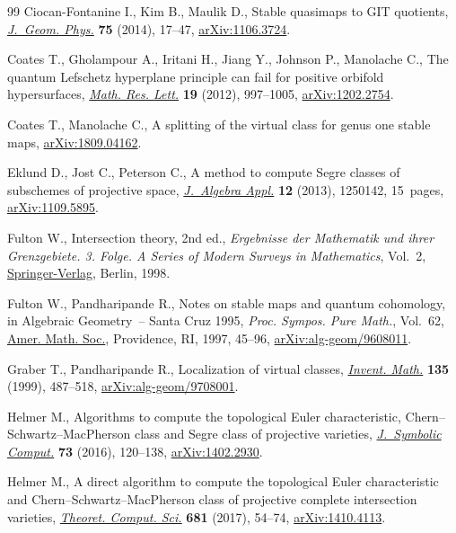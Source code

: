 \documentclass[pdftex]{sigma}
\numberwithin{equation}{section}
\theoremstyle{plain}
\theoremstyle{definition}
\theoremstyle{remark}
\begin{document}
\begin{thebibliography}{99}
Ciocan-Fontanine I., Kim B., Maulik D., Stable quasimaps to {GIT} quotients,
 \href{https://doi.org/10.1016/j.geomphys.2013.08.019}{\textit{J.~Geom. Phys.}} \textbf{75} (2014), 17--47, \href{https://arxiv.org/abs/1106.3724}{arXiv:1106.3724}.

Coates T., Gholampour A., Iritani H., Jiang Y., Johnson P., Manolache C., The
 quantum {L}efschetz hyperplane principle can fail for positive orbifold
 hypersurfaces, \href{https://doi.org/10.4310/MRL.2012.v19.n5.a3}{\textit{Math. Res. Lett.}} \textbf{19} (2012), 997--1005,
 \href{https://arxiv.org/abs/1202.2754}{arXiv:1202.2754}.

Coates T., Manolache C., A splitting of the virtual class for genus one stable
 maps, \href{https://arxiv.org/abs/1809.04162}{arXiv:1809.04162}.

Eklund D., Jost C., Peterson C., A method to compute {S}egre classes of
 subschemes of projective space, \href{https://doi.org/10.1142/S0219498812501423}{\textit{J.~Algebra Appl.}} \textbf{12} (2013),
 1250142, 15~pages, \href{https://arxiv.org/abs/1109.5895}{arXiv:1109.5895}.

Fulton W., Intersection theory, 2nd ed., \textit{Ergebnisse der Mathematik und ihrer
 Grenzgebiete. 3. Folge. A Series of Modern Surveys in Mathematics}, Vol.~2,
 \href{https://doi.org/10.1007/978-1-4612-1700-8}{Springer-Verlag}, Berlin, 1998.

Fulton W., Pandharipande R., Notes on stable maps and quantum cohomology, in
 Algebraic Geometry~-- {S}anta {C}ruz 1995, \textit{Proc. Sympos. Pure Math.},
 Vol.~62, \href{https://doi.org/10.1090/pspum/062.2/1492534}{Amer. Math. Soc.}, Providence, RI, 1997, 45--96,
 \href{https://arxiv.org/abs/alg-geom/9608011}{arXiv:alg-geom/9608011}.

Graber T., Pandharipande R., Localization of virtual classes, \href{https://doi.org/10.1007/s002220050293}{\textit{Invent.
 Math.}} \textbf{135} (1999), 487--518, \href{https://arxiv.org/abs/alg-geom/9708001}{arXiv:alg-geom/9708001}.

Helmer M., Algorithms to compute the topological {E}uler characteristic,
 {C}hern--{S}chwartz--{M}ac{P}herson class and {S}egre class of projective
 varieties, \href{https://doi.org/10.1016/j.jsc.2015.03.007}{\textit{J.~Symbolic Comput.}} \textbf{73} (2016), 120--138,
 \href{https://arxiv.org/abs/1402.2930}{arXiv:1402.2930}.

Helmer M., A direct algorithm to compute the topological {E}uler characteristic
 and {C}hern--{S}chwartz--{M}ac{P}herson class of projective complete
 intersection varieties, \href{https://doi.org/10.1016/j.tcs.2017.03.029}{\textit{Theoret. Comput. Sci.}} \textbf{681} (2017),
 54--74, \href{https://arxiv.org/abs/1410.4113}{arXiv:1410.4113}.


\end{thebibliography}
\end{document}
